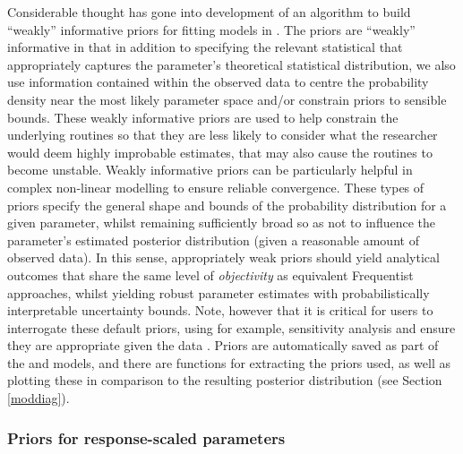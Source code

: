 \documentclass[
  shortnames]{jss}
\begin{document}
Considerable thought has gone into development of an algorithm to build ``weakly'' informative priors for fitting models in . The priors are ``weakly'' informative in that in addition to specifying the relevant statistical  that appropriately captures the parameter's theoretical statistical distribution, we also use information contained within the observed data to centre the probability density near the most likely parameter space and/or constrain priors to sensible bounds. These weakly informative priors are used to help constrain the underlying routines so that they are less likely to consider what the researcher would deem highly improbable estimates, that may also cause the routines to become unstable. Weakly informative priors can be particularly helpful in complex non-linear modelling to ensure reliable convergence. These types of priors specify the general shape and bounds of the probability distribution for a given parameter, whilst remaining sufficiently broad so as not to influence the parameter's estimated posterior distribution (given a reasonable amount of observed data). In this sense, appropriately weak priors should yield analytical outcomes that share the same level of \emph{objectivity} as equivalent Frequentist approaches, whilst yielding robust parameter estimates with probabilistically interpretable uncertainty bounds. Note, however that it is critical for users to interrogate these default priors, using for example, sensitivity analysis \citep{depaoli2020importance} and ensure they are appropriate given the data \citep{gelman2017entropy}. Priors are automatically saved as part of the  and  models, and there are functions for extracting the priors used, as well as plotting these in comparison to the resulting posterior distribution (see Section \ref{moddiag}).

\hypertarget{priors-for-response-scaled-parameters}{%
\subsubsection{Priors for response-scaled parameters}\label{priors-for-response-scaled-parameters}}
\end{document}
